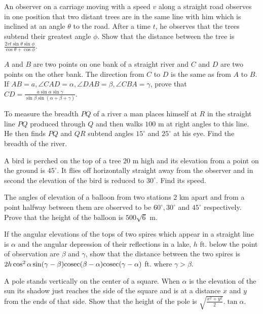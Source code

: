 \item An observer on a carriage moving with a speed $v$ along a straight road observes in one position that two distant trees
  are in the same line with him which is inclined at an angle $\theta$ to the road. After a time $t$, he observes
  that the trees subtend their greatest angle $\phi$. Show that the distance between the tree is
  $\frac{2vt\sin\theta\sin\phi}{\cos\theta + \cos\phi}$.

\item $A$ and $B$ are two points on one bank of a straight river and $C$ and $D$ are two points on the other
  bank. The direction from $C$ to $D$ is the same as from $A$ to $B$. If $AB = a, \angle CAD =
  \alpha, \angle DAB = \beta, \angle CBA = \gamma$, prove that $CD = \frac{a\sin\alpha\sin\gamma}{\sin\beta\sin(\alpha +
    \beta + \gamma)}$.

\item To measure the breadth $PQ$ of a river a man places himself at $R$ in the straight line $PQ$ produced
  through $Q$ and then walks $100$ m at right angles to this line. He then finds $PQ$ and $QR$ subtend
  angles $15^\circ$ and $25^\circ$ at his eye. Find the breadth of the river.

\item A bird is perched on the top of a tree $20$ m high and its elevation from a point on the ground is $45^\circ$. It
  flies off horizontally straight away from the observer and in second the elevation of the bird is reduced to
  $30^\circ$. Find its speed.

\item The angles of elevation of a balloon from two stations $2$ km apart and from a point halfway between them are observed
  to be $60^\circ, 30^\circ$ and $45^\circ$ respectively. Prove that the height of the balloon is
  $500\sqrt{6}$ m.

\item If the angular elevations of the tops of two spires which appear in a straight line is $\alpha$ and the angular
  depression of their reflections in a lake, $h$ ft. below the point of observation are $\beta$ and $\gamma$,
  show that the distance between the two spires is $2h\cos^2\alpha\sin(\gamma - \beta){\rm cosec}(\beta - \alpha){\rm
    cosec}(\gamma - \alpha)$ ft. where $\gamma > \beta$.

\item A pole stands vertically on the center of a square. When $\alpha$ is the elevation of the sun its shadow just reaches
  the side of the square and is at a distance $x$ and $y$ from the ends of that side. Show that the height of the
  pole is $\sqrt{\frac{x^2 + y^2}{2}}.\tan\alpha$.

